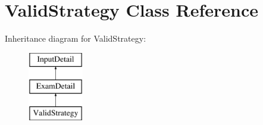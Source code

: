 \hypertarget{classValidStrategy}{\section{Valid\-Strategy Class Reference}
\label{classValidStrategy}
}
Inheritance diagram for Valid\-Strategy\-:\begin{figure}[H]
\begin{center}
\leavevmode
\includegraphics[height=3.000000cm]{d9/d15/classValidStrategy}
\end{center}
\end{figure}
